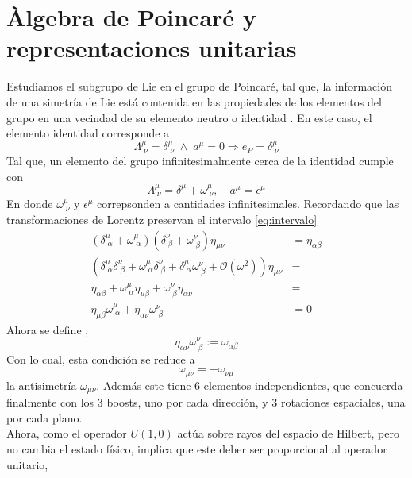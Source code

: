 \documentclass[12pt,letterpaper]{article}
\begin{document}
\section{Àlgebra de Poincaré y representaciones unitarias}
Estudiamos el subgrupo de Lie en el grupo de Poincaré, tal que, la información de una simetría de Lie está contenida en las propiedades de los elementos del grupo en una vecindad de su elemento neutro o identidad \cite{weinberg-v1}. En este caso, el elemento identidad corresponde a
\begin{equation}
  \Lambda^\mu_{\;\nu} = \delta^\mu_{\;\nu} \;\wedge \; a^\mu =0\Rightarrow e_{P} = \delta^\mu_{\;\nu}
\end{equation}
Tal que, un elemento del grupo infinitesimalmente cerca de la identidad cumple con
\begin{equation}
  \Lambda^\mu_{\; \nu} =\delta^\mu + \omega^\mu_{\;\nu},\quad a^\mu = \epsilon^\mu
\end{equation}
En donde $\omega^\mu_{\;\nu}$ y $\epsilon^\mu$ correpsonden a cantidades infinitesimales. Recordando que las transformaciones de Lorentz preservan el intervalo \eqref{eq:intervalo}
\begin{align*}
  \left( \delta^\mu_{\;\alpha} + \omega^\mu_{\;\alpha} \right) \left( \delta^\nu_{\;\beta} + \omega^\nu_{\;\beta} \right)\eta_{\mu\nu} & = \eta_{\alpha \beta} \\
  \left( \delta^\mu_{\;\alpha} \delta^\nu_{\;\beta} + \omega^\mu_{\;\alpha}\delta^\nu_{\;\beta} + \delta^\mu_{\;\alpha}\omega^\nu_{\;\beta} + \mathcal{O}(\omega^2)\right)\eta_{\mu\nu} & =  \\
  \eta_{\alpha \beta} + \omega^\mu_{\;\alpha}\eta_{\mu \beta} + \omega^\nu_{\;\beta}\eta_{\alpha \nu} & = \\
  \eta_{\mu\beta} \omega^\mu_{\;\alpha} +\eta_{\alpha \nu} \omega^\nu_{\;\beta} & = 0
\end{align*}
Ahora se define \cite{apunte},
\begin{equation}
  \boxed{ \eta_{\alpha \nu} \omega^\nu_{\;\beta} := \omega_{\alpha \beta}}
\end{equation}
Con lo cual, esta condición se reduce a
\begin{equation}
  \omega_{\mu\nu} = -\omega_{\nu\mu} 
\end{equation}
la antisimetría $\omega_{\mu\nu}$. Además este tiene 6 elementos independientes, que concuerda finalmente con los 3 boosts, uno por cada dirección, y 3 rotaciones espaciales, una por cada plano. \\
Ahora, como el operador $U(1,0)$ actúa sobre rayos del espacio de Hilbert, pero no cambia el estado físico, implica que este deber ser proporcional al operador unitario,
\end{document}

